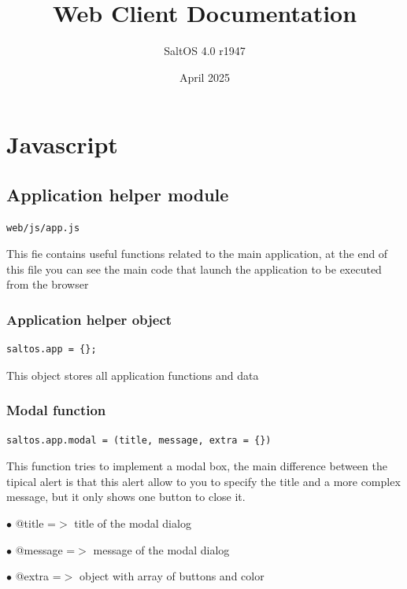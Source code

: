 \documentclass[a4paper]{article}
\title{Web Client Documentation}
\author{SaltOS 4.0 r1947}
\begin{document}
\date{April 2025}
\maketitle
\clearpage

\tableofcontents
\clearpage


\hypertarget{toc1}{}
\section{Javascript}

\hypertarget{toc2}{}
\subsection{Application helper module}

\begin{lstlisting}
web/js/app.js
\end{lstlisting}

This fie contains useful functions related to the main application, at the end of this file you
can see the main code that launch the application to be executed from the browser

\hypertarget{toc3}{}
\subsubsection{Application helper object}

\begin{lstlisting}
saltos.app = {};
\end{lstlisting}

This object stores all application functions and data

\hypertarget{toc4}{}
\subsubsection{Modal function}

\begin{lstlisting}
saltos.app.modal = (title, message, extra = {})
\end{lstlisting}

This function tries to implement a modal box, the main difference between the tipical alert
is that this alert allow to you to specify the title and a more complex message, but it only
shows one button to close it.

\begin{compactitem}
\item[\color{myblue}$\bullet$] @title   =$>$ title of the modal dialog
\item[\color{myblue}$\bullet$] @message =$>$ message of the modal dialog
\item[\color{myblue}$\bullet$] @extra   =$>$ object with array of buttons and color
\end{compactitem}
\end{document}

